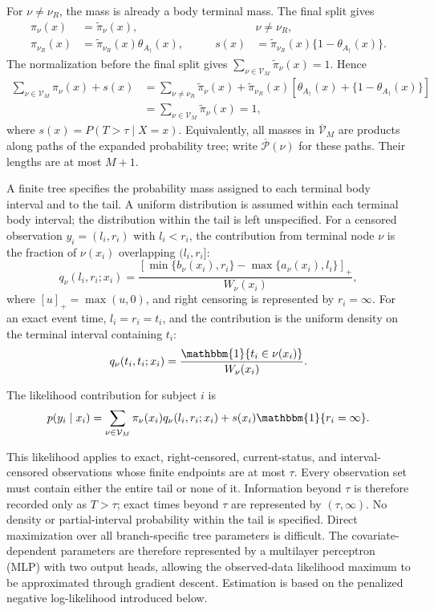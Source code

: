 \documentclass[11pt]{article}
\numberwithin{equation}{section}
\begin{document}
For $\nu\neq\nu_R$, the mass is already a body terminal mass. The final split gives
\begin{equation}
\begin{aligned}
    \pi_\nu(x)&=\widetilde\pi_\nu(x), &&\nu\neq\nu_R,\\
    \pi_{\nu_R}(x)&=\widetilde\pi_{\nu_R}(x)\theta_{A_\dagger}(x),&\qquad
    s(x)&=\widetilde\pi_{\nu_R}(x)\{1-\theta_{A_\dagger}(x)\}.
\end{aligned}
\label{eq:body-tail-masses}
\end{equation}
The normalization before the final split gives $\sum_{\nu\in\mathcal V_M}\widetilde\pi_\nu(x)=1$. Hence
\begin{align*}
    \sum_{\nu\in\mathcal V_M}\pi_\nu(x)+s(x)
    &=\sum_{\nu\ne\nu_R}\widetilde\pi_\nu(x)
      +\widetilde\pi_{\nu_R}(x)
         [\theta_{A_\dagger}(x)+\{1-\theta_{A_\dagger}(x)\}]\\
    &=\sum_{\nu\in\mathcal V_M}\widetilde\pi_\nu(x)=1,
\end{align*}
where $s(x)=P(T>\tau\mid X=x)$. Equivalently, all masses in $\overline{\mathcal V}_M$ are products along paths of the expanded probability tree; write $\overline{\mathcal P}(\nu)$ for these paths. Their lengths are at most $M+1$.

A finite tree specifies the probability mass assigned to each terminal body interval and to the tail. A uniform distribution is assumed within each terminal body interval; the distribution within the tail is left unspecified. For a censored observation $y_i=(l_i,r_i)$ with $l_i<r_i$, the contribution from terminal node $\nu$ is the fraction of $\nu(x_i)$ overlapping $(l_i,r_i]$:
$$
    q_\nu(l_i,r_i;x_i)
    =
    \frac{
        \left[\min\{b_\nu(x_i),r_i\}-\max\{a_\nu(x_i),l_i\}\right]_+
    }{
        W_\nu(x_i)
    },
$$
where $[u]_+=\max(u,0)$, and right censoring is represented by $r_i=\infty$. For an exact event time, $l_i=r_i=t_i$, and the contribution is the uniform density on the terminal interval containing $t_i$:
$$
    q_\nu(t_i,t_i;x_i)
    =
    \frac{\mathbbm{1}\{t_i\in\nu(x_i)\}}{W_\nu(x_i)}.
$$

The likelihood contribution for subject $i$ is
$$
    p(y_i\mid x_i)
    =
    \sum_{\nu\in\mathcal V_M}
    \pi_\nu(x_i)
    q_\nu(l_i,r_i;x_i)+s(x_i)\mathbbm{1}\{r_i=\infty\}.
$$

This likelihood applies to exact, right-censored, current-status, and interval-censored observations whose finite endpoints are at most $\tau$. Every observation set must contain either the entire tail or none of it. Information beyond $\tau$ is therefore recorded only as $T>\tau$; exact times beyond $\tau$ are represented by $(\tau,\infty)$. No density or partial-interval probability within the tail is specified. Direct maximization over all branch-specific tree parameters is difficult. The covariate-dependent parameters are therefore represented by a multilayer perceptron (MLP) with two output heads, allowing the observed-data likelihood maximum to be approximated through gradient descent. Estimation is based on the penalized negative log-likelihood introduced below.
\end{document}
